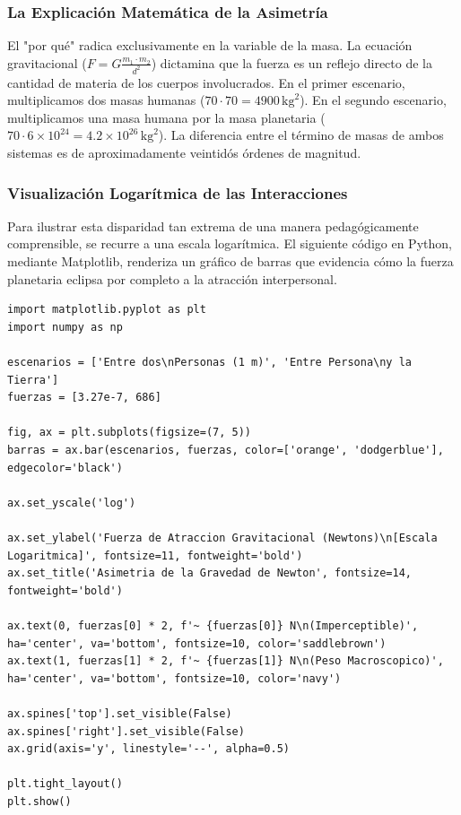 \documentclass[12pt]{article}
\begin{document}
\subsubsection*{La Explicación Matemática de la Asimetría}
El "por qué" radica exclusivamente en la variable de la masa. La ecuación gravitacional ($F = G \frac{m_1 \cdot m_2}{d^2}$) dictamina que la fuerza es un reflejo directo de la cantidad de materia de los cuerpos involucrados. 
En el primer escenario, multiplicamos dos masas humanas ($70 \cdot 70 = 4900 \, \text{kg}^2$). 
En el segundo escenario, multiplicamos una masa humana por la masa planetaria ($70 \cdot 6 \times 10^{24} = 4.2 \times 10^{26} \, \text{kg}^2$). 
La diferencia entre el término de masas de ambos sistemas es de aproximadamente veintidós órdenes de magnitud. 

\subsubsection*{Visualización Logarítmica de las Interacciones}
Para ilustrar esta disparidad tan extrema de una manera pedagógicamente comprensible, se recurre a una escala logarítmica. El siguiente código en Python, mediante Matplotlib, renderiza un gráfico de barras que evidencia cómo la fuerza planetaria eclipsa por completo a la atracción interpersonal.

\begin{lstlisting}
import matplotlib.pyplot as plt
import numpy as np

escenarios = ['Entre dos\nPersonas (1 m)', 'Entre Persona\ny la Tierra']
fuerzas = [3.27e-7, 686] 

fig, ax = plt.subplots(figsize=(7, 5))
barras = ax.bar(escenarios, fuerzas, color=['orange', 'dodgerblue'], edgecolor='black')

ax.set_yscale('log')

ax.set_ylabel('Fuerza de Atraccion Gravitacional (Newtons)\n[Escala Logaritmica]', fontsize=11, fontweight='bold')
ax.set_title('Asimetria de la Gravedad de Newton', fontsize=14, fontweight='bold')

ax.text(0, fuerzas[0] * 2, f'~ {fuerzas[0]} N\n(Imperceptible)', ha='center', va='bottom', fontsize=10, color='saddlebrown')
ax.text(1, fuerzas[1] * 2, f'~ {fuerzas[1]} N\n(Peso Macroscopico)', ha='center', va='bottom', fontsize=10, color='navy')

ax.spines['top'].set_visible(False)
ax.spines['right'].set_visible(False)
ax.grid(axis='y', linestyle='--', alpha=0.5)

plt.tight_layout()
plt.show()
\end{lstlisting}
\end{document}
